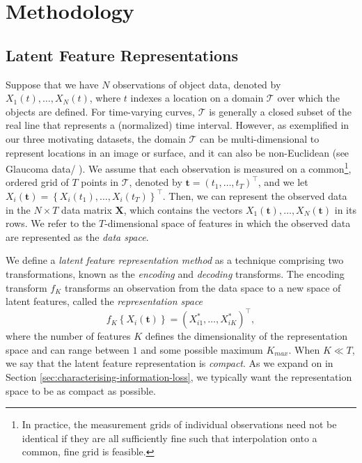 \section{Methodology}\label{sec:materials-and-methods}

\subsection{Latent Feature Representations}

Suppose that we have $N$ observations of object data, denoted by $X_1 (t), \dots, X_N(t)$, where $t$ indexes a location on a domain $\mathcal{T}$ over which the objects are defined.
For time-varying curves, $\mathcal{T}$ is generally a closed subset of the real line that represents a (normalized) time interval.
However, as exemplified in our three motivating datasets, the domain $\mathcal{T}$ can be multi-dimensional to represent locations in an image or surface, and it can also be non-Euclidean ({see Glaucoma data/ \textcite{lee_bayesian_2019}}).
We assume that each observation is measured on a common\footnote{In practice, the measurement grids of individual observations need not be identical if they are all sufficiently fine such that interpolation onto a common, fine grid is feasible.}, ordered grid of $T$ points in $\mathcal{T}$, denoted by $\mathbf{t} = \left(t_1, \dots, t_T\right)^\top$, and we let $X_i(\mathbf{t}) = \left\{X_i(t_1), \dots, X_i(t_T)\right\}^\top$.
Then, we can represent the observed data in the $N \times T$ data matrix $\mathbf{X}$, which contains the vectors $X_1(\mathbf{t}), \dots, X_N(\mathbf{t})$ in its rows.
We refer to the $T$-dimensional space of features in which the observed data are represented as the \emph{data space}.

We define a \emph{latent feature representation method} as a technique comprising two transformations, known as the \emph{encoding} and \emph{decoding} transforms.
The encoding transform $f_{K}$ transforms an observation from the data space to a new space of latent features, called the \emph{representation space}
$$
f_{K} \left\{X_i(\mathbf{t})\right\} = \left(X_{i1}^*, \dots,  X_{iK}^* \right)^\top,
$$
where the number of features $K$ defines the dimensionality of the representation space and can range between $1$ and some possible maximum $K_{max}$. When $K \ll T$, we say that the latent feature representation is \emph{compact}.
As we expand on in Section \ref{sec:characterising-information-loss}, we typically want the representation space to be as compact as possible.

